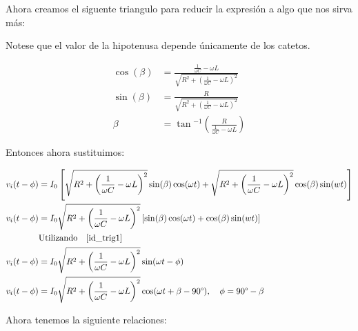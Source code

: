 Ahora creamos el siguente triangulo para reducir la expresión a algo que nos
sirva más:

\begin{center}
\end{center}

Notese que el valor de la hipotenusa depende únicamente de los catetos.

\begin{align*}
  \cos(\beta) &= \frac{\frac{1}{\omega C} - \omega L}{\sqrt{R^2 + \left(\frac{1}{\omega C} - \omega L\right)^2}} \\
  \sin(\beta) &= \frac{R}{\sqrt{R^2 + \left(\frac{1}{\omega C} - \omega L\right)^2}} \\
  \beta &= \tan{^{-1}}\left(\frac{R}{\frac{1}{\omega C} - \omega L}\right)
\end{align*}

Entonces ahora sustituimos:

\begin{align*}
  v_i(t-\phi) &= I_0 \left[\sqrt{R^2 + \left(\frac{1}{\omega C} - \omega L\right)^2} \sin(\beta) \cos(\omega t) + \sqrt{R^2 + \left(\frac{1}{\omega C} - \omega L\right)^2} \cos(\beta) \sin(wt) \right] \\
  v_i(t-\phi) &= I_0 \sqrt{R^2 + \left(\frac{1}{\omega C} - \omega L\right)^2} \left[ \sin(\beta) \cos(\omega t) + \cos(\beta) \sin(wt) \right]\\
  &\mathrm{Utilizando\quad}\ref{id_trig1}\\
  v_i(t-\phi) &= I_0 \sqrt{R^2 + \left(\frac{1}{\omega C} - \omega L\right)^2} \sin(\omega t - \phi) \\
  v_i(t-\phi) &= I_0 \sqrt{R^2 + \left(\frac{1}{\omega C} - \omega L\right)^2} \cos(\omega t + \beta - 90\degree),\quad \phi = 90\degree - \beta
\end{align*}

Ahora tenemos la siguiente relaciones:

